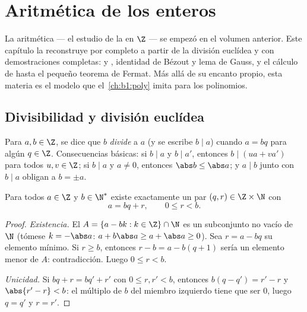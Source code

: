 \chapter{Aritmética de los enteros}\label{ch:b1:arith}

La aritmética --- el estudio de la  en $\Z$ --- se empezó
en el volumen anterior. Este capítulo la reconstruye por completo a
partir de la división euclídea y con demostraciones completas:
 y , identidad de Bézout y
lema de Gauss,  y el cálculo de 
hasta el pequeño teorema de Fermat. Más allá de su encanto propio, esta
materia es el modelo que el~\cref{ch:b1:poly} imita para los polinomios.

\section{Divisibilidad y división euclídea}

\begin{definition}[Divisibilidad]\label{def:b1:arith:divides}
Para $a, b \in \Z$, se dice que $b$ \emph{divide} a $a$ (y se escribe
$b \mid a$) cuando $a = bq$ para algún
$q \in \Z$. Consecuencias básicas: si $b \mid a$ y $b \mid a'$,
entonces $b \mid (ua + va')$ para todos $u, v \in \Z$; si $b \mid a$ y
$a \neq 0$, entonces $\abs b \leq \abs a$; y $a \mid b$ junto con
$b \mid a$ obligan a $b = \pm a$.
\end{definition}

\begin{theorem}\label{thm:b1:arith:division}
Para todos $a \in \Z$ y $b \in \N^*$ existe exactamente un par
$(q, r) \in \Z \times \N$ con
\[
a = bq + r, \qquad 0 \leq r < b .
\]
\end{theorem}

\begin{proof}
\emph{Existencia.} El  $A = \{a - bk : k \in \Z\} \cap \N$ es
un subconjunto no vacío de $\N$ (tómese $k = -\abs a$: $a + b\abs a
\geq a + \abs a \geq 0$). Sea $r = a - bq$ su elemento mínimo. Si
$r \geq b$, entonces $r - b = a - b(q+1)$ sería un elemento menor de
$A$: contradicción. Luego $0 \leq r < b$.

\emph{Unicidad.} Si $bq + r = bq' + r'$ con $0 \leq r, r' < b$,
entonces $b(q - q') = r' - r$ y $\abs{r' - r} < b$: el múltiplo de $b$
del miembro izquierdo tiene que ser $0$, luego $q = q'$ y $r = r'$.
\end{proof}

